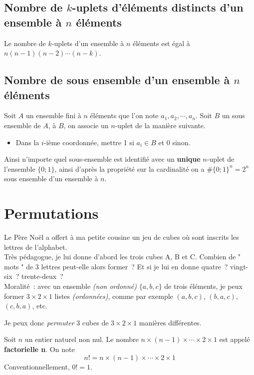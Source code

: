 \documentclass[french]{book}
\begin{document}
\subsection{Nombre de $k$-uplets d'éléments distincts d'un ensemble à $n$ éléments}
\begin{prop}
Le nombre  de $k$-uplets d'un ensemble à $n$ éléments est égal à $n(n-1)(n-2)\cdots(n-k)$. 
\end{prop}

\subsection{Nombre de sous ensemble d’un ensemble à $n$ éléments}
Soit $A$ un ensemble fini à $n$ éléments que l'on note $a_1,a_2,\cdots,a_n$. Soit $B$ un sous ensemble de $A$, à $B$, on associe un $n$-uplet de la manière suivante.
\begin{itemize}
\item[$\bullet$]Dans la $i$-ième coordonnée, mettre 1 si $a_i \in B$ et 0 sinon.
\end{itemize}
Ainsi n'importe quel sous-ensemble est identifié avec un \textbf{unique} $n$-uplet de l'ensemble $\{0;1\}$, ainsi d'apr\`es la propriété sur la cardinalité on a $\# \{0;1\}^n =2^n$ sous ensemble d'un ensemble à $n$.  
\section{Permutations}

Le Père Noël a offert à ma petite cousine un jeu de cubes
où sont inscrits les lettres de l'alphabet.\\

Très pédagogue, je lui donne d'abord les trois cubes A, B et C.
Combien de " mots " de 3 lettres peut-elle alors former~? Et si
je lui en donne quatre~? vingt-six~? trente-deux~?\\


Moralité~: avec un ensemble \textit{(non ordonné)} $\{a,b,c\}$ de
trois éléments, je peux former $3\times 2\times 1$ listes
\textit{(ordonnées)}, comme par exemple $(a,b,c)$, $(b,a,c)$,
$(c,b,a)$, etc.

Je peux donc \textit{permuter} 3 cubes de $3\times 2\times 1$
manières différentes.

\begin{defn}[factorielle]
  Soit $n$ un entier naturel non nul. Le nombre $n\times(n-1)\times\cdots\times2\times1$ est appelé \textbf{factorielle n}. On
note
$$n!=n\times(n-1)\times\cdots\times2\times1$$
Conventionnellement, $0!=1$.
\end{defn}
\end{document}
